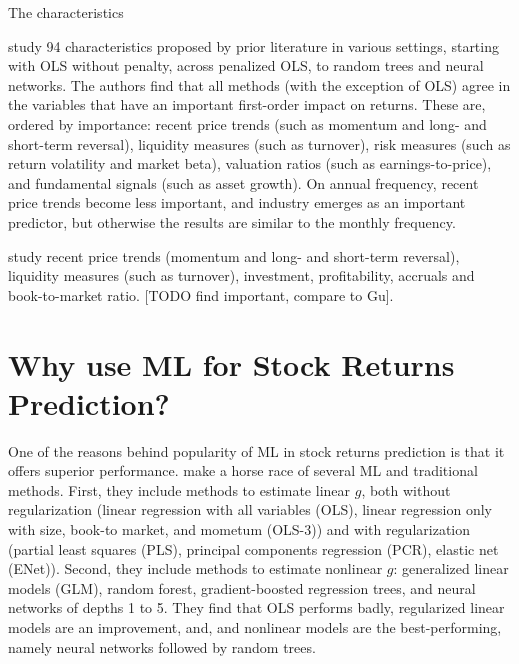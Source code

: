 		The characteristics 
		
		\cite{gu2020empirical} study 94 characteristics proposed by prior literature in various settings, starting with OLS without penalty, across penalized OLS, to random trees and neural networks. The authors find that all methods (with the exception of OLS) agree in the variables that have an important first-order impact on returns. These are, ordered by importance: recent price trends (such as momentum and long- and short-term reversal), liquidity measures (such as turnover), risk measures (such as return volatility and market beta), valuation ratios (such as earnings-to-price), and fundamental signals (such as asset growth). On annual frequency, recent price trends become less important, and industry emerges as an important predictor, but otherwise the results are similar to the monthly frequency. 
		
		\cite{bryzgalova2019forest} study recent price trends (momentum and long- and short-term reversal), liquidity measures (such as turnover), investment, profitability, accruals and book-to-market ratio. [TODO find important, compare to Gu]. 		
		
				
		\section{Why use ML for Stock Returns Prediction?}
				
			
			One of the reasons behind popularity of ML in stock returns prediction is that it offers superior performance. \cite{gu2020empirical} make a horse race of several ML and traditional methods. First, they include methods to estimate linear $g$, both without regularization (linear regression with all variables (OLS), linear regression only with size, book-to market, and mometum (OLS-3)) and with regularization (partial least squares (PLS), principal components regression (PCR), elastic net (ENet)). Second, they include methods to estimate nonlinear $g$: generalized linear models (GLM), random forest, gradient-boosted regression trees, and neural networks of depths 1 to 5. They find that OLS performs badly, regularized linear models are an improvement, and, and nonlinear models are the best-performing, namely neural networks followed by random trees. 
			
